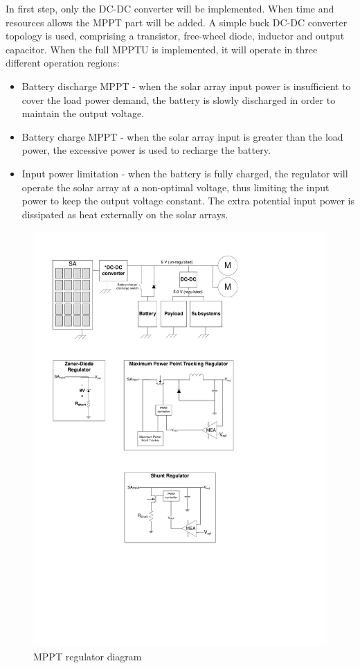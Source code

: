 In first step, only the DC-DC converter will be implemented. When time and resources allows the \ac{MPPT} part will be added.
A simple buck DC-DC converter topology is used, comprising a transistor, free-wheel diode, inductor and output capacitor. 
When the full \ac{MPPTU} is implemented, it will operate in three different operation regions:
%
\begin{itemize}
\item Battery discharge {MPPT} - when the solar array input power is insufficient to cover the load power demand, the battery is slowly discharged in order to maintain the output voltage.
\item Battery charge {MPPT} - when the solar array input is greater than the load power, the excessive power is used to recharge the battery.
\item Input power limitation - when the battery is fully charged, the regulator will operate the solar array at a non-optimal voltage, thus limiting the input power to keep the output voltage constant. The extra potential input power is dissipated as heat externally on the solar arrays.
\end{itemize}
%
\begin{figure}[H]
\centering
\includegraphics[scale=1]{figures/fig_PDR_MPPTdiagram}
\caption{\ac{MPPT} regulator diagram}
\label{fig:MPPT_regulator}
\end{figure}
%



